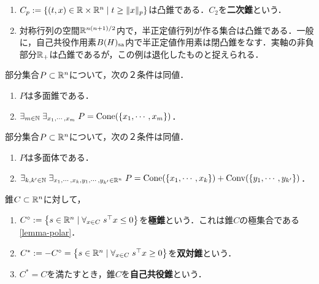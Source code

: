 \documentclass[uplatex,dvipdfmx]{jsreport}
\begin{document}
\begin{example}\mbox{}
    \begin{enumerate}
        \item $C_p:=\left\{(t,x)\in\mathbb{R}\times\mathbb{R}^n\mid t\ge\|x\|_p\right\}$は凸錐である．$C_2$を\textbf{二次錐}という．
        \item 対称行列の空間$\mathbb{R}^{n(n+1)/2}$内で，半正定値行列が作る集合は凸錐である．一般に，自己共役作用素$B(H)_{\mathrm{sa}}$内で半正定値作用素は閉凸錐をなす．実軸の非負部分$\mathbb{R}_+$は凸錐であるが，この例は退化したものと捉えられる．
    \end{enumerate}
\end{example}


\begin{lemma}[多面錐の特徴付け]
    部分集合$P\subset\mathbb{R}^n$について，次の２条件は同値．
    \begin{enumerate}
        \item $P$は多面錐である．
        \item $\exists_{m\in\mathbb{N}}\;\exists_{x_1,\cdots,x_m}\;P=\mathrm{Cone}(\{x_1,\cdots,x_m\})$．
    \end{enumerate}
\end{lemma}

\begin{lemma}[多面体の特徴付け]
    部分集合$P\subset\mathbb{R}^n$について，次の２条件は同値．
    \begin{enumerate}
        \item $P$は多面体である．
        \item $\exists_{k,k'\in\mathbb{N}}\;\exists_{x_1,\cdots,x_k,y_1,\cdots,y_{k'}\in\mathbb{R}^n}\;P=\mathrm{Cone}(\{x_1,\cdots,x_k\})+\mathrm{Conv}(\{y_1,\cdots,y_{k'}\})$．
    \end{enumerate}
\end{lemma}

\begin{definition}
    錐$C\subset\mathbb{R}^n$に対して，
    \begin{enumerate}
        \item $C^\circ:=\left\{s\in\mathbb{R}^n\mid\forall_{x\in C}\;s^\top x\le0\right\}$を\textbf{極錐}という．これは錐$C$の極集合である\ref{lemma-polar}．
        \item $C^*:=-C^\circ=\left\{s\in\mathbb{R}^n\mid\forall_{x\in C}\; s^\top x\ge0\right\}$を\textbf{双対錐}という．
        \item $C^*=C$を満たすとき，錐$C$を\textbf{自己共役錐}という．
    \end{enumerate}
\end{definition}
\end{document}
